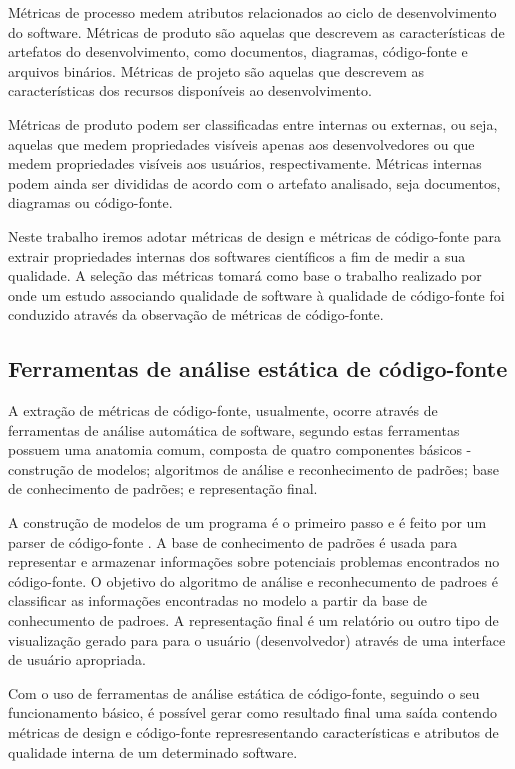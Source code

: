 \documentclass[qual, classic, a4paper]{ufbathesis}
\begin{document}
Métricas de processo medem atributos relacionados
ao ciclo de desenvolvimento do software. Métricas de produto são aquelas que
descrevem as características de artefatos do desenvolvimento, como documentos,
diagramas, código-fonte e arquivos binários. Métricas de projeto são aquelas
que descrevem as características dos recursos disponíveis ao desenvolvimento.

Métricas de produto podem ser classificadas entre internas ou externas, ou
seja, aquelas que medem propriedades visíveis apenas aos desenvolvedores ou
que medem propriedades visíveis aos usuários, respectivamente.
Métricas internas podem ainda ser divididas de acordo com o artefato
analisado, seja documentos, diagramas ou código-fonte.

Neste trabalho iremos adotar métricas de design e métricas de código-fonte
para extrair propriedades internas dos softwares científicos a fim de medir a
sua qualidade. A seleção das métricas tomará como base o trabalho realizado
por  onde um estudo associando qualidade de software
à qualidade de código-fonte foi conduzido através da observação de métricas de
código-fonte.

\subsection{Ferramentas de análise estática de código-fonte}

A extração de métricas de código-fonte, usualmente, ocorre através de ferramentas de
análise automática de software, segundo  estas
ferramentas possuem uma anatomia comum, composta de quatro componentes básicos
- construção de modelos; algoritmos de análise e reconhecimento de padrões;
base de conhecimento de padrões; e representação final.

A construção de modelos de um programa é o primeiro passo e é feito por um
parser de código-fonte \cite{Binkley2007}. A base de conhecimento de padrões é usada para
representar e armazenar informações sobre potenciais problemas encontrados no
código-fonte. O objetivo do algoritmo de análise e reconhecumento de padroes é
classificar as informações encontradas no modelo a partir da base de
conhecumento de padroes. A representação final é um relatório ou outro tipo de
visualização gerado para para o usuário (desenvolvedor) através de uma
interface de usuário apropriada.

Com o uso de ferramentas de análise estática de código-fonte, seguindo o seu
funcionamento básico, é possível gerar como resultado final uma saída contendo
métricas de design e código-fonte represresentando características e atributos
de qualidade interna de um determinado software.
\end{document}
